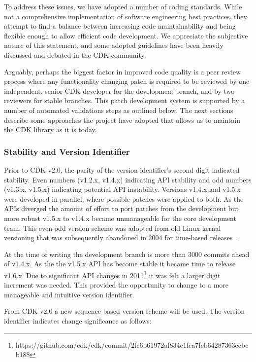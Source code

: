 \documentclass[doublespacing]{bmcart}
\def \cdkversion {v2.0}
\begin{document}
To address these issues, we have adopted a number of coding
standards. While not a comprehensive implementation of software
engineering best practices, they attempt to find a balance between
increasing code maintainability and being flexible enough to allow
efficient code development. We appreciate the subjective
nature of this statement, and some adopted guidelines have been
heavily discussed and debated in the CDK community.

Arguably, perhaps the biggest factor in improved code quality is a
peer review process where any functionality changing patch is required
to be reviewed by one independent, senior CDK developer for the
development branch, and by two reviewers for stable branches. This patch
development system is supported by a number of automated validations
steps as outlined below.
The next sections describe some approaches the project have adopted that allows
us to maintain the CDK library as it is today. 

\subsubsection*{Stability and Version Identifier}

Prior to CDK \cdkversion{}, the parity of the version identifier's second digit 
indicated stability. Even numbers (v1.2.x, v1.4.x) indicating API stability and
odd numbers (v1.3.x, v1.5.x) indicating potential API instability. Versions 
v1.4.x and v1.5.x were developed in parallel, where possible patches were
applied to both. As the APIs diverged the amount of effort to port patches
from the development but more robust v1.5.x to v1.4.x 
became unmanageable for the core development team. This even-odd version scheme
was adopted from old Linux kernal versioning that was subsequently
abandoned in 2004 for time-based releases~\cite{LinuxKernalVersionNumbering}.

At the time of writing the development branch is more than 3000 commits ahead
of v1.4.x. As the the v1.5.x API has become stable it became time to release 
v1.6.x. Due to significant API changes in 2011\footnote{https://github.com/cdk/cdk/commit/2fc6b61972af834c1fea7fcb64287363ecbcb188}
it was felt a larger digit increment was needed. This provided the 
opportunity to change to a more manageable and intuitive version identifier.

From CDK \cdkversion{} a new sequence based version scheme will be used. The
version identifier indicates change significance as follows:
\end{document}
